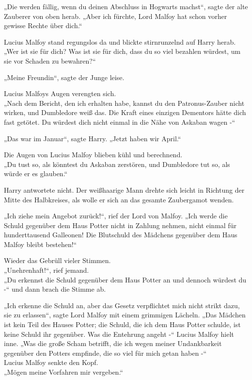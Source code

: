 {„Die werden fällig, wenn du deinen Abschluss in Hogwarts machst“, sagte der alte Zauberer von oben herab. „Aber ich fürchte, Lord Malfoy hat schon vorher gewisse Rechte über dich.“

Lucius Malfoy stand regungslos da und blickte stirnrunzelnd auf Harry herab.\\ „Wer ist sie für dich? Was ist sie für dich, dass du so viel bezahlen würdest, um sie vor Schaden zu bewahren?“

„Meine Freundin“, sagte der Junge leise.

Lucius Malfoys Augen verengten sich.\\ „Nach dem Bericht, den ich erhalten habe, kannst du den Patronus-Zauber nicht wirken, und Dumbledore weiß das. Die Kraft eines einzigen Dementors hätte dich fast getötet. Du würdest dich nicht einmal in die Nähe von Askaban wagen -“

„Das war im Januar“, sagte Harry. „Jetzt haben wir April.“

Die Augen von Lucius Malfoy blieben kühl und berechnend.\\ „Du tust so, als könntest du Askaban zerstören, und Dumbledore tut so, als würde er es glauben.“

Harry antwortete nicht. Der weißhaarige Mann drehte sich leicht in Richtung der Mitte des Halbkreises, als wolle er sich an das gesamte Zaubergamot wenden.

„Ich ziehe mein Angebot zurück!“, rief der Lord von Malfoy. „Ich werde die Schuld gegenüber dem Haus Potter nicht in Zahlung nehmen, nicht einmal für hunderttausend Galleonen! Die Blutschuld des Mädchens gegenüber dem Haus Malfoy bleibt bestehen!“

Wieder das Gebrüll vieler Stimmen.\\ „Unehrenhaft!“, rief jemand.\\ „Du erkennst die Schuld gegenüber dem Haus Potter an und dennoch würdest du -“ und dann brach die Stimme ab.

„Ich erkenne die Schuld an, aber das Gesetz verpflichtet mich nicht strikt dazu, sie zu erlassen“, sagte Lord Malfoy mit einem grimmigen Lächeln. „Das Mädchen ist kein Teil des Hauses Potter; die Schuld, die ich dem Haus Potter schulde, ist keine Schuld ihr gegenüber. Was die Entehrung angeht -“ Lucius Malfoy hielt inne. „Was die große Scham betrifft, die ich wegen meiner Undankbarkeit gegenüber den Potters empfinde, die so viel für mich getan haben -“\\ Lucius Malfoy senkte den Kopf.\\ „Mögen meine Vorfahren mir vergeben.“

}
